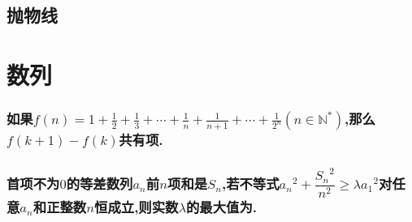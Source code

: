 \documentclass[oneside]{book}
\newcommand{\1}{\underline{\makebox[1cm]{}}}
\newcommand{\2}{\underline{\makebox[2cm]{}}}
\newcommand{\3}{\underline{\makebox[3cm]{}}}
\newcommand{\4}{\underline{\makebox[4cm]{}}}
\newcommand{\blk}{\vspace*{1\baselineskip} }
\newcommand{\blkc}{\vspace*{6\baselineskip} }
\newlength{\la}
\begin{document}
    \chapter{抛物线}



\part{数列}

    \section{如果$f(n)=1+\frac{1}{2}+\frac{1}{3}+\cdots+\frac{1}{n}+\frac{1}{n+1}+\cdots+\frac{1}{2^n}(n\in \mathbb{N^*})$,那么$f(k+1)-f(k)$共有\2项.}
    \blk

    \section{首项不为$0$的等差数列${a_n}$前$n$项和是$S_n$,若不等式${a_n}^2+\dfrac{{S_n}^2}{n^2}\ge \lambda {a_1}^2$对任意$a_n$和正整数$n$恒成立,则实数$\lambda$的最大值为\2.}
    \blkc
\end{document}

